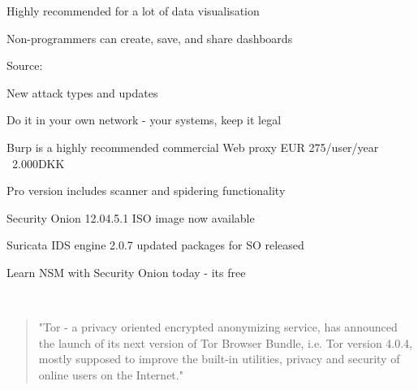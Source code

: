 \documentclass[20pt,landscape,a4paper,footrule]{foils}
\begin{document}

\centerline{Highly recommended for a lot of data visualisation}

Non-programmers can create, save, and share dashboards

Source:








\begin{list1}
\item New attack types and updates 
\item Do it in your own network - your systems, keep it legal
\item Burp is a highly recommended commercial Web proxy EUR 275/user/year ~2.000DKK
\item Pro version includes scanner and spidering functionality
\end{list1}




\begin{list2}
\item Security Onion 12.04.5.1 ISO image now available
\item Suricata IDS engine 2.0.7 updated packages for SO released
\item Learn NSM with Security Onion today - its free
\end{list2}
{\small{}\\
}




\begin{quote}
"Tor - a privacy oriented encrypted anonymizing service, has announced the launch of its next version of Tor Browser Bundle, i.e. Tor version 4.0.4, mostly supposed to improve the built-in utilities, privacy and security of online users on the Internet."
	\end{quote}
\end{document}
